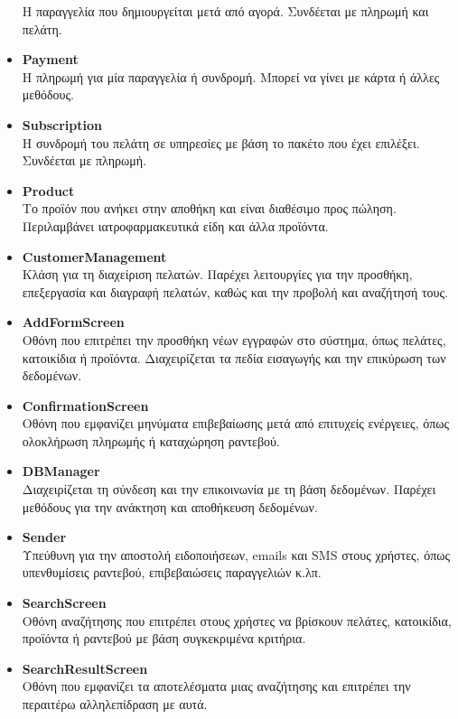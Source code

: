 \documentclass[12pt,a4paper,twoside]{book}
\begin{document}
\begin{itemize}
          Η παραγγελία που δημιουργείται μετά από αγορά. Συνδέεται με πληρωμή και πελάτη. %
    \item \textbf{Payment}\\
          Η πληρωμή για μία παραγγελία ή συνδρομή. Μπορεί να γίνει με κάρτα ή άλλες μεθόδους. %
    \item \textbf{Subscription}\\
          Η συνδρομή του πελάτη σε υπηρεσίες με βάση το πακέτο που έχει επιλέξει. Συνδέεται με πληρωμή. %
    \item \textbf{Product}\\
          Το προϊόν που ανήκει στην αποθήκη και είναι διαθέσιμο προς πώληση. Περιλαμβάνει ιατροφαρμακευτικά είδη και άλλα προϊόντα. %
    \item \textbf{CustomerManagement}\\
          Κλάση για τη διαχείριση πελατών. Παρέχει λειτουργίες για την προσθήκη, επεξεργασία και διαγραφή πελατών, καθώς και την προβολή και αναζήτησή τους. %
    \item \textbf{AddFormScreen}\\
          Οθόνη που επιτρέπει την προσθήκη νέων εγγραφών στο σύστημα, όπως πελάτες, κατοικίδια ή προϊόντα. Διαχειρίζεται τα πεδία εισαγωγής και την επικύρωση των δεδομένων. %
    \item \textbf{ConfirmationScreen}\\
          Οθόνη που εμφανίζει μηνύματα επιβεβαίωσης μετά από επιτυχείς ενέργειες, όπως ολοκλήρωση πληρωμής ή καταχώρηση ραντεβού.
    \item \textbf{DBManager}\\
          Διαχειρίζεται τη σύνδεση και την επικοινωνία με τη βάση δεδομένων. Παρέχει μεθόδους για την ανάκτηση και αποθήκευση δεδομένων. %
    \item \textbf{Sender}\\
          Υπεύθυνη για την αποστολή ειδοποιήσεων, emails και SMS στους χρήστες, όπως υπενθυμίσεις ραντεβού, επιβεβαιώσεις παραγγελιών κ.λπ. %
    \item \textbf{SearchScreen}\\
          Οθόνη αναζήτησης που επιτρέπει στους χρήστες να βρίσκουν πελάτες, κατοικίδια, προϊόντα ή ραντεβού με βάση συγκεκριμένα κριτήρια. %
    \item \textbf{SearchResultScreen}\\
          Οθόνη που εμφανίζει τα αποτελέσματα μιας αναζήτησης και επιτρέπει την περαιτέρω αλληλεπίδραση με αυτά. %

\end{itemize}
\end{document}
